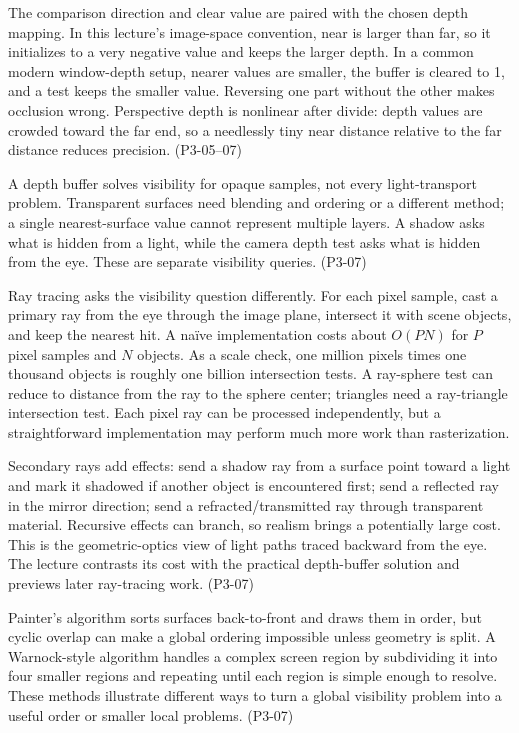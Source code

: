 The comparison direction and clear value are paired with the chosen depth mapping. In this lecture's image-space convention, near is larger than far, so it initializes to a very negative value and keeps the larger depth. In a common modern window-depth setup, nearer values are smaller, the buffer is cleared to 1, and a  test keeps the smaller value. Reversing one part without the other makes occlusion wrong. Perspective depth is nonlinear after divide: depth values are crowded toward the far end, so a needlessly tiny near distance relative to the far distance reduces precision. (P3-05--07)

A depth buffer solves visibility for opaque samples, not every light-transport problem. Transparent surfaces need blending and ordering or a different method; a single nearest-surface value cannot represent multiple layers. A shadow asks what is hidden from a light, while the camera depth test asks what is hidden from the eye. These are separate visibility queries. (P3-07)

Ray tracing asks the visibility question differently. For each pixel sample, cast a primary ray from the eye through the image plane, intersect it with scene objects, and keep the nearest hit. A naïve implementation costs about \(O(PN)\) for \(P\) pixel samples and \(N\) objects. As a scale check, one million pixels times one thousand objects is roughly one billion intersection tests. A ray-sphere test can reduce to distance from the ray to the sphere center; triangles need a ray-triangle intersection test. Each pixel ray can be processed independently, but a straightforward implementation may perform much more work than rasterization.

Secondary rays add effects: send a shadow ray from a surface point toward a light and mark it shadowed if another object is encountered first; send a reflected ray in the mirror direction; send a refracted/transmitted ray through transparent material. Recursive effects can branch, so realism brings a potentially large cost. This is the geometric-optics view of light paths traced backward from the eye. The lecture contrasts its cost with the practical depth-buffer solution and previews later ray-tracing work. (P3-07)

Painter's algorithm sorts surfaces back-to-front and draws them in order, but cyclic overlap can make a global ordering impossible unless geometry is split. A Warnock-style algorithm handles a complex screen region by subdividing it into four smaller regions and repeating until each region is simple enough to resolve. These methods illustrate different ways to turn a global visibility problem into a useful order or smaller local problems. (P3-07)

